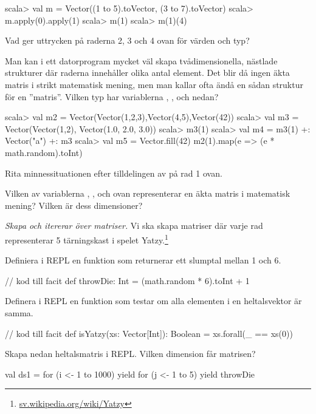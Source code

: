 \begin{REPL}
scala> val m = Vector((1 to 5).toVector, (3 to 7).toVector)
scala> m.apply(0).apply(1)
scala> m(1)
scala> m(1)(4)
\end{REPL}

\Subtask Vad ger uttrycken på raderna 2, 3 och 4 ovan för värden och typ? 

\Subtask Man kan i ett datorprogram mycket väl skapa tvådimensionella, nästlade strukturer där raderna innehåller olika antal element. Det blir då ingen äkta matris i strikt matematisk mening, men man kallar ofta ändå en sådan struktur för en ''matris''. Vilken typ har variablerna , ,  och  nedan? 

\begin{REPL}
scala> val m2 = Vector(Vector(1,2,3),Vector(4,5),Vector(42))
scala> val m3 = Vector(Vector(1,2), Vector(1.0, 2.0, 3.0))
scala> m3(1)
scala> val m4 = m3(1) +: Vector("a") +: m3
scala> val m5 = Vector.fill(42){ m2(1).map(e => (e * math.random).toInt) }
\end{REPL}

\Subtask\Pen Rita minnessituationen efter tilldelingen av  på rad 1 ovan.

\Subtask\Pen Vilken av variablerna , ,  och  ovan representerar en äkta matris i matematisk mening? Vilken är dess dimensioner?



\Task \emph{Skapa och itererar över matriser.} Vi ska skapa matriser där varje rad representerar 5 tärningskast i spelet Yatzy.\footnote{\href{https://sv.wikipedia.org/wiki/Yatzy}{sv.wikipedia.org/wiki/Yatzy}}


\Subtask Definiera i REPL en funktion  som returnerar ett slumptal mellan 1 och 6.
\begin{Code}
// kod till facit
def throwDie: Int = (math.random * 6).toInt + 1
\end{Code}

\Subtask Definera i REPL en funktion  som testar om alla elementen i en heltalsvektor är samma. 
\begin{Code}
// kod till facit
def isYatzy(xs: Vector[Int]): Boolean = xs.forall(_ == xs(0))
\end{Code}


\Subtask Skapa nedan heltalsmatris i REPL. Vilken dimension får matrisen?
\begin{REPL}
val ds1 = for (i <- 1 to 1000) yield { 
            for (j <- 1 to 5) yield throwDie 
          }
\end{REPL}

